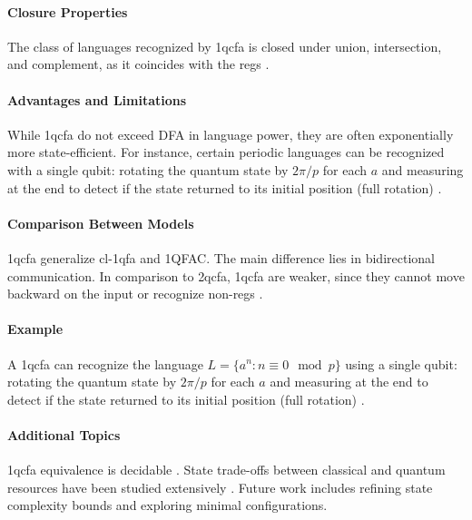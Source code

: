 \paragraph{Closure Properties}  
The class of languages recognized by \gls{1qcfa} is closed under union, intersection, and complement, as it coincides with the \glspl{reg} \cite{li2015hybrid}.

\paragraph{Advantages and Limitations}  
While \gls{1qcfa} do not exceed DFA in language power, they are often exponentially more state-efficient. For instance, certain periodic languages can be recognized with a single qubit: rotating the quantum state by $2\pi/p$ for each $a$ and measuring at the end to detect if the state returned to its initial position (full rotation) \cite{xiao2021state, bianchi2014size}.

\paragraph{Comparison Between Models}  
\gls{1qcfa} generalize \gls{cl-1qfa} and 1QFAC. The main difference lies in bidirectional communication. In comparison to \gls{2qcfa}, \gls{1qcfa} are weaker, since they cannot move backward on the input or recognize non-\glspl{reg} \cite{li2015hybrid}.

\paragraph{Example}  
A \gls{1qcfa} can recognize the language $L = \{ a^n : n \equiv 0 \mod p \}$ using a single qubit: rotating the quantum state by $2\pi/p$ for each $a$ and measuring at the end to detect if the state returned to its initial position (full rotation) \cite{bianchi2014power}.

\paragraph{Additional Topics}  
\gls{1qcfa} equivalence is decidable \cite{li2015hybrid}. State trade-offs between classical and quantum resources have been studied extensively \cite{qiu2009equivalence, xiao2021state}. Future work includes refining state complexity bounds and exploring minimal configurations.


\subsubsection{}

